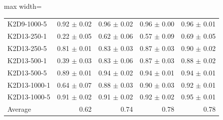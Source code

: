 \documentclass{article}
\begin{document}
\begin{table}[ht]
\begin{center}
\begin{small}
\begin{adjustbox}{max width=\columnwidth}
\begin{tabular}{l|rrrr}
K2D9-1000-5 & 0.92 $\pm$ 0.02 & 0.96 $\pm$ 0.02 & 0.96 $\pm$ 0.00 & 0.96 $\pm$ 0.01\\
K2D13-250-1 & 0.22 $\pm$ 0.05 & 0.62 $\pm$ 0.06 & 0.57 $\pm$ 0.09 & 0.69 $\pm$ 0.05\\
K2D13-250-5 & 0.81 $\pm$ 0.01 & 0.83 $\pm$ 0.03 & 0.87 $\pm$ 0.03 & 0.90 $\pm$ 0.02\\
K2D13-500-1 & 0.39 $\pm$ 0.03 & 0.83 $\pm$ 0.06 & 0.87 $\pm$ 0.03 & 0.88 $\pm$ 0.02\\
K2D13-500-5 & 0.89 $\pm$ 0.01 & 0.94 $\pm$ 0.02 & 0.94 $\pm$ 0.01 & 0.94 $\pm$ 0.01\\
K2D13-1000-1 & 0.64 $\pm$ 0.07 & 0.88 $\pm$ 0.03 & 0.90 $\pm$ 0.03 & 0.92 $\pm$ 0.01\\
K2D13-1000-5 & 0.91 $\pm$ 0.02 & 0.91 $\pm$ 0.02 & 0.92 $\pm$ 0.02 & 0.95 $\pm$ 0.01\\
\midrule
Average & 0.62 & 0.74 & 0.78 & 0.78\\
\end{tabular}
        \end{adjustbox}
    \end{small}
    \end{center}
    \vskip -0.1in
\end{table}
\FloatBarrier
\end{document}
